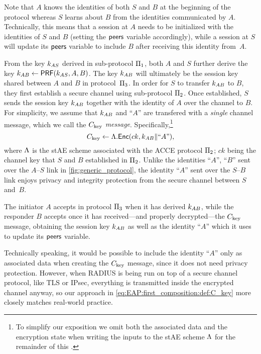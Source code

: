 Note that $A$ knows the identities of both $S$ and $B$ at the beginning of the protocol
whereas $S$ learns about $B$ from the identities communicated by $A$.
Technically,
this means that a session at $A$ needs to be initialized with the identities of $S$ and $B$
(setting the $\mathsf{peers}$ variable accordingly),
while a session at $S$ will update its $\mathsf{peers}$ variable to include $B$ after receiving this identity from~$A$. 

From the key $k_{AS}$ derived in sub-protocol $\mathrm{\Pi}_1$,
both $A$ and $S$ further derive the key $k_{AB} \gets \mathsf{PRF}(k_{AS},A,B)$.
The key $k_{AB}$ will ultimately be the session key shared between $A$ and $B$ in protocol~$\mathrm{\Pi}_3$.
In order for $S$ to transfer $k_{AB}$ to $B$,
 they first establish a secure channel using sub-protocol $\mathrm{\Pi}_2$.
Once established,
$S$ sends the session key $k_{AB}$ together with the identity of $A$ over the channel to $B$.
For simplicity,
we assume that $k_{AB}$ and ``$A$'' are transfered with a \emph{single} channel message,
which we call the \emph{$C_{\mathrm{key}}$ message}.
Specifically,\footnote{To 
simplify our exposition we omit both the associated data and the encryption state when writing the inputs to the stAE scheme $\Lambda$ for the remainder of this .  
}
\begin{equation}\label{eq:EAP:first_composition:def:C_key}
	C_{\mathrm{key}} \gets \Lambda.\mathsf{Enc}(ck, k_{AB} \| ``A") ,
\end{equation}
where $\Lambda$ is the stAE scheme associated with the ACCE protocol $\mathrm{\Pi}_2$;
$ck$ being the channel key that $S$ and $B$ established in $\mathrm{\Pi}_2$.
Unlike the identities ``$A$'', ``$B$'' sent over the $A$--$S$ link in \cref{fig:generic_protocol},
the identity ``$A$'' sent over the $S$--$B$ link enjoys privacy and integrity protection from the secure channel between $S$ and~$B$.

The initiator $A$ accepts in protocol $\mathrm{\Pi}_3$ when it has derived $k_{AB}$,
while the responder $B$ accepts once it has received---and properly decrypted---the $C_{\mathrm{key}}$ message,
obtaining the session key $k_{AB}$ as well as the identity ``$A$'' which it uses to update its $\mathsf{peers}$ variable.

\begin{remark}
Technically speaking,
it would be possible to include the identity ``$A$'' only as associated data when creating the $C_{\mathrm{key}}$ message,
since it does not need privacy protection.
However,
when RADIUS is being run on top of a secure channel protocol,
like TLS or IPsec,
everything is transmitted inside the encrypted channel anyway,
so our approach in \cref{eq:EAP:first_composition:def:C_key} more closely matches real-world practice.
\end{remark}

